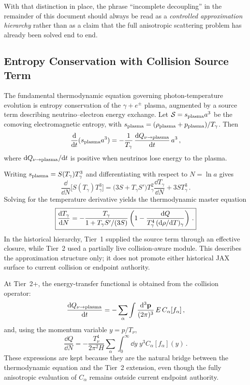 With that distinction in place, the phrase ``incomplete decoupling'' in the remainder of this document should always be read as a \emph{controlled approximation hierarchy} rather than as a claim that the full anisotropic scattering problem has already been solved end to end.

\subsection{Entropy Conservation with Collision Source Term}

The fundamental thermodynamic equation governing photon-temperature evolution is entropy conservation of the $\gamma+e^\pm$ plasma, augmented by a source term describing neutrino--electron energy exchange.  Let $\mathcal S = s_{\rm plasma}a^3$ be the comoving electromagnetic entropy, with $s_{\rm plasma}=(\rho_{\rm plasma}+p_{\rm plasma})/T_\gamma$.  Then
\begin{equation}
\frac{\mathrm{d}}{\mathrm{d} t}(s_{\rm plasma}a^3) = -\frac{1}{T_\gamma}\,\frac{\mathrm{d} Q_{\nu\to{\rm plasma}}}{\mathrm{d} t}\,a^3\,,\label{eq:entropy_full}
\end{equation}
where $\mathrm{d} Q_{\nu\to{\rm plasma}}/\mathrm{d} t$ is positive when neutrinos lose energy to the plasma.

Writing $s_{\rm plasma}=S(T_\gamma)T_\gamma^3$ and differentiating with respect to $N=\ln a$ gives
\begin{equation}
\frac{\dd}{\dd N}\bigl[S(T_\gamma)T_\gamma^3\bigr] = \bigl(3S+T_\gamma S'\bigr)T_\gamma^2\frac{\dd T_\gamma}{\dd N}+3ST_\gamma^3\,.
\end{equation}
Solving for the temperature derivative yields the thermodynamic master equation
\begin{equation}
\boxed{\frac{\mathrm{d} T_\gamma}{\mathrm{d} N} = -\frac{T_\gamma}{1 + T_\gamma S'/(3S)}\left(1 - \frac{\mathrm{d} Q}{T_\gamma^4\,(\mathrm{d}\rho/\mathrm{d} T)_\gamma}\right)\,.}\label{eq:dTgamma_dN}
\end{equation}
In the historical hierarchy, Tier~1 supplied the source term through an effective closure, while Tier~2 used a partially live collision-aware module.  This describes the approximation structure only; it does not promote either historical JAX surface to current collision or endpoint authority.

At Tier~2+, the energy-transfer functional is obtained from the collision operator:
\begin{equation}
\frac{\mathrm{d} Q_{\nu\to\rm plasma}}{\mathrm{d} t} = -\sum_\alpha \int \frac{\mathrm{d}^3\mathbf p}{(2\pi)^3}\,E\,C_\alpha[f_\alpha] \, ,
\end{equation}
and, using the momentum variable $y=p/T_\nu$,
\begin{equation}
\frac{\dd Q}{\dd N} = -\frac{T_\nu^4}{2\pi^2 H}\sum_\alpha\int_0^\infty \dd y\; y^3 C_\alpha[f_\alpha](y)\,.
\end{equation}
These expressions are kept because they are the natural bridge between the thermodynamic equation and the Tier~2 extension, even though the fully anisotropic evaluation of $C_\alpha$ remains outside current endpoint authority.

